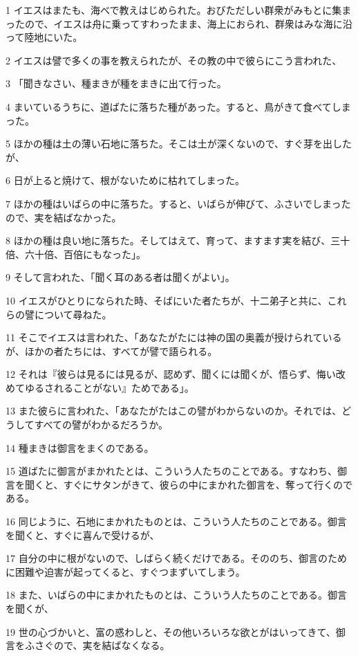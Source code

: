 \par 1 イエスはまたも、海べで教えはじめられた。おびただしい群衆がみもとに集まったので、イエスは舟に乗ってすわったまま、海上におられ、群衆はみな海に沿って陸地にいた。
\par 2 イエスは譬で多くの事を教えられたが、その教の中で彼らにこう言われた、
\par 3 「聞きなさい、種まきが種をまきに出て行った。
\par 4 まいているうちに、道ばたに落ちた種があった。すると、鳥がきて食べてしまった。
\par 5 ほかの種は土の薄い石地に落ちた。そこは土が深くないので、すぐ芽を出したが、
\par 6 日が上ると焼けて、根がないために枯れてしまった。
\par 7 ほかの種はいばらの中に落ちた。すると、いばらが伸びて、ふさいでしまったので、実を結ばなかった。
\par 8 ほかの種は良い地に落ちた。そしてはえて、育って、ますます実を結び、三十倍、六十倍、百倍にもなった」。
\par 9 そして言われた、「聞く耳のある者は聞くがよい」。
\par 10 イエスがひとりになられた時、そばにいた者たちが、十二弟子と共に、これらの譬について尋ねた。
\par 11 そこでイエスは言われた、「あなたがたには神の国の奥義が授けられているが、ほかの者たちには、すべてが譬で語られる。
\par 12 それは『彼らは見るには見るが、認めず、聞くには聞くが、悟らず、悔い改めてゆるされることがない』ためである」。
\par 13 また彼らに言われた、「あなたがたはこの譬がわからないのか。それでは、どうしてすべての譬がわかるだろうか。
\par 14 種まきは御言をまくのである。
\par 15 道ばたに御言がまかれたとは、こういう人たちのことである。すなわち、御言を聞くと、すぐにサタンがきて、彼らの中にまかれた御言を、奪って行くのである。
\par 16 同じように、石地にまかれたものとは、こういう人たちのことである。御言を聞くと、すぐに喜んで受けるが、
\par 17 自分の中に根がないので、しばらく続くだけである。そののち、御言のために困難や迫害が起ってくると、すぐつまずいてしまう。
\par 18 また、いばらの中にまかれたものとは、こういう人たちのことである。御言を聞くが、
\par 19 世の心づかいと、富の惑わしと、その他いろいろな欲とがはいってきて、御言をふさぐので、実を結ばなくなる。
